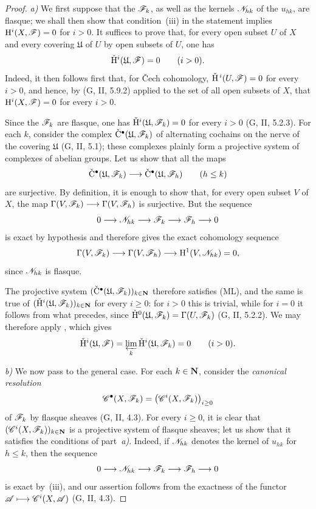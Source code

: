 \begin{proof}
\emph{a)}
We first suppose that the $\mathscr{F}_k$, as well as the kernels
$\mathscr{N}_{hk}$ of the $u_{hk}$, are flasque; we shall then show that
condition~{\rm(iii)} in the statement implies
$\mathrm{H}^i(X,\mathscr{F})=0$ for $i>0$.
It suffices to prove that, for every open subset $U$ of $X$ and every
covering $\mathfrak{U}$ of $U$ by open subsets of $U$, one has
\[
  \check{\mathrm{H}}^i(\mathfrak{U},\mathscr{F})=0
  \qquad (i>0).
\]
Indeed, it then follows first that, for \v{C}ech cohomology,
$\check{\mathrm{H}}^{\,i}(U,\mathscr{F})=0$ for every $i>0$, and hence, by
(G, II, 5.9.2) applied to the set of all open subsets of $X$, that
$\mathrm{H}^i(X,\mathscr{F})=0$ for every $i>0$.

Since the $\mathscr{F}_k$ are flasque, one has
$\check{\mathrm{H}}^i(\mathfrak{U},\mathscr{F}_k)=0$ for every $i>0$
(G, II, 5.2.3).
For each $k$, consider the complex
$\check{\mathrm{C}}^\bullet(\mathfrak{U},\mathscr{F}_k)$ of alternating
cochains on the nerve of the covering $\mathfrak{U}$ (G, II, 5.1);
these complexes plainly form a projective system of complexes of
abelian groups.
Let us show that all the maps
\[
  \check{\mathrm{C}}^\bullet(\mathfrak{U},\mathscr{F}_k)
  \longrightarrow
  \check{\mathrm{C}}^\bullet(\mathfrak{U},\mathscr{F}_h)
  \qquad(h\leq k)
\]
are surjective.
By definition, it is enough to show that, for every open subset $V$
of $X$, the map
$\Gamma(V,\mathscr{F}_k)\longrightarrow\Gamma(V,\mathscr{F}_h)$ is
surjective. But the sequence
\[
  0\longrightarrow\mathscr{N}_{hk}\longrightarrow\mathscr{F}_k
  \longrightarrow\mathscr{F}_h\longrightarrow0
\]
is exact by hypothesis and therefore gives the exact cohomology
sequence
\[
  \Gamma(V,\mathscr{F}_k)\longrightarrow\Gamma(V,\mathscr{F}_h)
  \longrightarrow\mathrm{H}^1(V,\mathscr{N}_{hk})=0,
\]
since $\mathscr{N}_{hk}$ is flasque.

The projective system
$(\check{\mathrm{C}}^\bullet(\mathfrak{U},\mathscr{F}_k))_{k\in\mathbf{N}}$
therefore satisfies (ML), and the same is true of
$(\check{\mathrm{H}}^i(\mathfrak{U},\mathscr{F}_k))_{k\in\mathbf{N}}$ for every $i\geq0$:
for $i>0$ this is trivial, while for $i=0$ it follows from what
precedes, since
$\check{\mathrm{H}}^0(\mathfrak{U},\mathscr{F}_k)=\Gamma(U,\mathscr{F}_k)$
(G, II, 5.2.2).
We may therefore apply , which gives
\[
  \check{\mathrm{H}}^i(\mathfrak{U},\mathscr{F})
  =
  \varprojlim_k\check{\mathrm{H}}^i(\mathfrak{U},\mathscr{F}_k)
  =0
  \qquad(i>0).
\]

\emph{b)}
We now pass to the general case. For each $k\in\mathbf{N}$, consider the
\emph{canonical resolution}
\[
  \mathscr{C}^\bullet(X,\mathscr{F}_k)
  =
  \bigl(\mathscr{C}^i(X,\mathscr{F}_k)\bigr)_{i\geq0}
\]
of $\mathscr{F}_k$ by flasque sheaves (G, II, 4.3).
For every $i\geq0$, it is clear that
$(\mathscr{C}^i(X,\mathscr{F}_k))_{k\in\mathbf{N}}$ is a projective system of
flasque sheaves; let us show that it satisfies the conditions of
part~\emph{a)}.
Indeed, if $\mathscr{N}_{hk}$ denotes the kernel of $u_{hk}$ for $h\leq k$,
then the sequence
\[
  0\longrightarrow\mathscr{N}_{hk}\longrightarrow\mathscr{F}_k
  \longrightarrow\mathscr{F}_h\longrightarrow0
\]
is exact by~{\rm(iii)}, and our assertion follows from the exactness
of the functor
$\mathscr{A}\longmapsto\mathscr{C}^i(X,\mathscr{A})$ (G, II, 4.3).


\end{proof}
